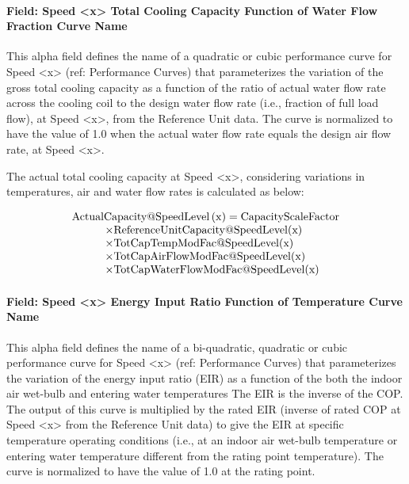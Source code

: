 \paragraph{Field: Speed \textless{}x\textgreater{} Total Cooling Capacity Function of Water Flow Fraction Curve Name}\label{field-speed-x-total-cooling-capacity-function-of-water-flow-fraction-curve-name}

This alpha field defines the name of a quadratic or cubic performance curve for Speed \textless{}x\textgreater{} (ref: Performance Curves) that parameterizes the variation of the gross total cooling capacity as a function of the ratio of actual water flow rate across the cooling coil to the design water flow rate (i.e., fraction of full load flow), at Speed \textless{}x\textgreater{}, from the Reference Unit data. The curve is normalized to have the value of 1.0 when the actual water flow rate equals the design air flow rate, at Speed \textless{}x\textgreater{}.

The actual total cooling capacity at Speed \textless{}x\textgreater{}, considering variations in temperatures, air and water flow rates is calculated as below:

\begin{equation}
  \begin{array}{l}
    \rm{ActualCapacity} @ \rm{SpeedLevel} \left( x \right) = \rm{CapacityScaleFactor} \\
    \quad \quad \quad \times \rm{ReferenceUnitCapacity} @ \rm{SpeedLevel}(x) \\
    \quad \quad \quad \times \rm{TotCapTempModFac} @ \rm{SpeedLevel}(x) \\
    \quad \quad \quad \times \rm{TotCapAirFlowModFac} @ \rm{SpeedLevel}(x) \\
    \quad \quad \quad \times \rm{TotCapWaterFlowModFac} @ \rm{SpeedLevel}(x)
  \end{array}
\end{equation}

\paragraph{Field: Speed \textless{}x\textgreater{} Energy Input Ratio Function of Temperature Curve Name}\label{field-speed-x-energy-input-ratio-function-of-temperature-curve-name-4}

This alpha field defines the name of a bi-quadratic, quadratic or cubic performance curve for Speed \textless{}x\textgreater{} (ref: Performance Curves) that parameterizes the variation of the energy input ratio (EIR) as a function of the both the indoor air wet-bulb and entering water temperatures The EIR is the inverse of the COP. The output of this curve is multiplied by the rated EIR (inverse of rated COP at Speed \textless{}x\textgreater{} from the Reference Unit data) to give the EIR at specific temperature operating conditions (i.e., at an indoor air wet-bulb temperature or entering water temperature different from the rating point temperature). The curve is normalized to have the value of 1.0 at the rating point.

